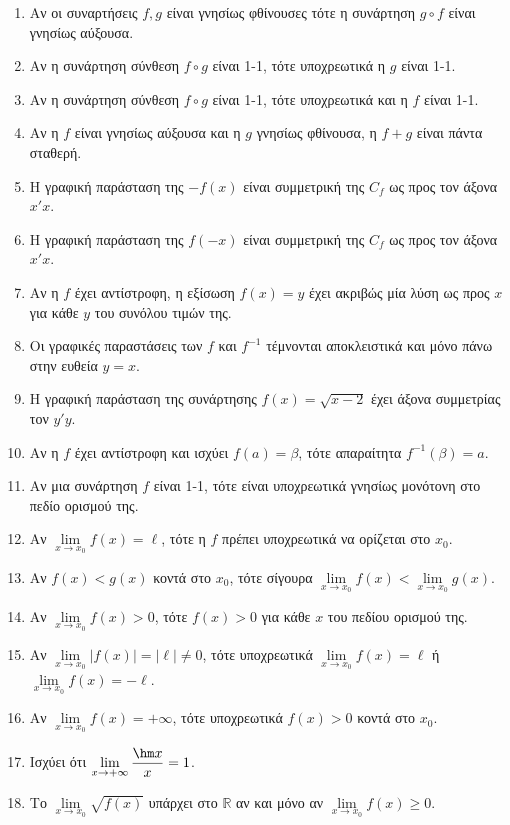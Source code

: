 \begin{enumerate}[label=\textbf{1.\arabic*.}]
    \item Αν οι συναρτήσεις $f,g$ είναι γνησίως φθίνουσες τότε η συνάρτηση $g\circ f$ είναι γνησίως αύξουσα.
    \item Αν η συνάρτηση σύνθεση $f \circ g$ είναι 1-1, τότε υποχρεωτικά η $g$ είναι 1-1.
    \item Αν η συνάρτηση σύνθεση $f \circ g$ είναι 1-1, τότε υποχρεωτικά και η $f$ είναι 1-1.
    \item Αν η $f$ είναι γνησίως αύξουσα και η $g$ γνησίως φθίνουσα, η $f+g$ είναι πάντα σταθερή.
    \item Η γραφική παράσταση της $-f(x)$ είναι συμμετρική της $C_f$ ως προς τον άξονα $x'x$.
    \item Η γραφική παράσταση της $f(-x)$ είναι συμμετρική της $C_f$ ως προς τον άξονα $x'x$.
    \item Αν η $f$ έχει αντίστροφη, η εξίσωση $f(x)=y$ έχει ακριβώς μία λύση ως προς $x$ για κάθε $y$ του συνόλου τιμών της.
    \item Οι γραφικές παραστάσεις των $f$ και $f^{-1}$ τέμνονται αποκλειστικά και μόνο πάνω στην ευθεία $y=x$.
    \item Η γραφική παράσταση της συνάρτησης $f(x) = \sqrt{x-2}$ έχει άξονα συμμετρίας τον $y'y$.
    \item Αν η $f$ έχει αντίστροφη και ισχύει $f(a)=\beta$, τότε απαραίτητα $f^{-1}(\beta)=a$.
    \item Αν μια συνάρτηση $f$ είναι 1-1, τότε είναι υποχρεωτικά γνησίως μονότονη στο πεδίο ορισμού της.
    \item Αν $\lim\limits_{x \to x_0} f(x) = \ell$, τότε η $f$ πρέπει υποχρεωτικά να ορίζεται στο $x_0$.
    \item Αν $f(x)<g(x)$ κοντά στο $x_0$, τότε σίγουρα $\lim\limits_{x \to x_0} f(x) < \lim\limits_{x \to x_0} g(x)$.
    \item Αν $\lim\limits_{x \to x_0} f(x) > 0$, τότε $f(x) > 0$ για κάθε $x$ του πεδίου ορισμού της.
    \item Αν $\lim\limits_{x \to x_0} |f(x)| = |\ell| \neq 0$, τότε υποχρεωτικά $\lim\limits_{x \to x_0} f(x) = \ell$ ή $\lim\limits_{x \to x_0} f(x) = -\ell$.
    \item Αν $\lim\limits_{x \to x_0} f(x) = +\infty$, τότε υποχρεωτικά $f(x) > 0$ κοντά στο $x_0$.
    \item Ισχύει ότι $\lim\limits_{x \to +\infty} \dfrac{\hm x}{x} = 1$.
    \item Το $\lim\limits_{x \to x_0} \sqrt{f(x)}$ υπάρχει στο $\mathbb{R}$ αν και μόνο αν $\lim\limits_{x \to x_0} f(x) \ge 0$.

\end{enumerate}
